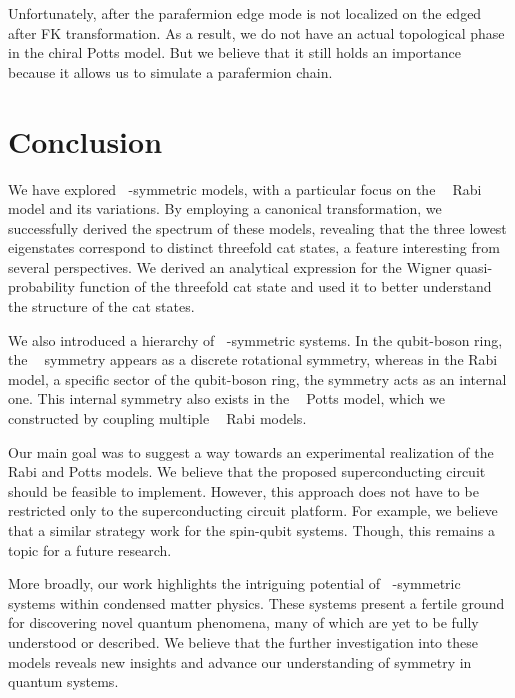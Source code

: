 \documentclass[reprint, aps, prx, amsmath, amssymb, longbibliography, superscriptaddress]{revtex4-2}
\DeclareMathOperator{\Zn}{\mathbb{Z}_n}
\DeclareMathOperator{\Zthree}{\mathbb{Z}_3}
\begin{document}
Unfortunately, after the parafermion edge mode is not localized on the edged after FK transformation. As a result, we do not have an actual topological phase in the chiral Potts model. But we believe that it still holds an importance because it allows us to simulate a parafermion chain.



\section{Conclusion}
\label{sec:conclusion}

We have explored $\Zthree$-symmetric models, with a particular focus on the $\Zthree$ Rabi model and its variations. By employing a canonical transformation, we successfully derived the spectrum of these models, revealing that the three lowest eigenstates correspond to distinct threefold cat states, a feature interesting from several perspectives. We derived an analytical expression for the Wigner quasi-probability function of the threefold cat state and used it to better understand the structure of the cat states.

We also introduced a hierarchy of $\Zthree$-symmetric systems. In the qubit-boson ring, the $\Zthree$ symmetry appears as a discrete rotational symmetry, whereas in the Rabi model, a specific sector of the qubit-boson ring, the symmetry acts as an internal one. This internal symmetry also exists in the $\Zthree$ Potts model, which we constructed by coupling multiple $\Zthree$ Rabi models.

Our main goal was to suggest a way towards an experimental realization of the $\Zthree$ Rabi and Potts models. We believe that the proposed superconducting circuit should be feasible to implement. However, this approach does not have to be restricted only to the superconducting circuit platform. For example, we believe that a similar strategy work for the spin-qubit systems. Though, this remains a topic for a future research.

More broadly, our work highlights the intriguing potential of $\Zn$-symmetric systems within condensed matter physics. These systems present a fertile ground for discovering novel quantum phenomena, many of which are yet to be fully understood or described. We believe that the further investigation into these models reveals new insights and advance our understanding of symmetry in quantum systems.
\end{document}
